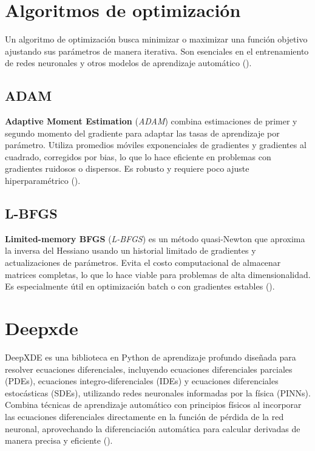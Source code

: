 \documentclass[
  spanish,
  us-letterpaper,
]{scrreprt}
\theoremstyle{definition}
\theoremstyle{plain}
\theoremstyle{remark}
\begin{document}
\section{Algoritmos de optimización}\label{sec-optimizadores}

Un algoritmo de optimización busca minimizar o maximizar una función
objetivo ajustando sus parámetros de manera iterativa. Son esenciales en
el entrenamiento de redes neuronales y otros modelos de aprendizaje
automático ().

\subsection{ADAM}\label{adam}

\textbf{Adaptive Moment Estimation} (\emph{ADAM}) combina estimaciones
de primer y segundo momento del gradiente para adaptar las tasas de
aprendizaje por parámetro. Utiliza promedios móviles exponenciales de
gradientes y gradientes al cuadrado, corregidos por bias, lo que lo hace
eficiente en problemas con gradientes ruidosos o dispersos. Es robusto y
requiere poco ajuste hiperparamétrico
().

\subsection{L-BFGS}\label{l-bfgs}

\textbf{Limited-memory BFGS} (\emph{L-BFGS}) es un método quasi-Newton
que aproxima la inversa del Hessiano usando un historial limitado de
gradientes y actualizaciones de parámetros. Evita el costo computacional
de almacenar matrices completas, lo que lo hace viable para problemas de
alta dimensionalidad. Es especialmente útil en optimización batch o con
gradientes estables ().

\section{Deepxde}\label{deepxde}

DeepXDE es una biblioteca en Python de aprendizaje profundo diseñada
para resolver ecuaciones diferenciales, incluyendo ecuaciones
diferenciales parciales (PDEs), ecuaciones integro-diferenciales (IDEs)
y ecuaciones diferenciales estocásticas (SDEs), utilizando redes
neuronales informadas por la física (PINNs). Combina técnicas de
aprendizaje automático con principios físicos al incorporar las
ecuaciones diferenciales directamente en la función de pérdida de la red
neuronal, aprovechando la diferenciación automática para calcular
derivadas de manera precisa y eficiente ().
\end{document}
